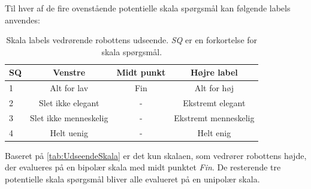 \newpage
%
Til hver af de fire ovenstående potentielle skala spørgsmål kan følgende labels anvendes:
%
\begin{table}[H]
	\centering
	\begin{tabular}{l|c|c|c}
		SQ     & Venstre & Midt punkt & Højre label \\\hline
		1   & Alt for lav  & Fin & Alt for høj        \\\hline
		2   & Slet ikke elegant & - & Ekstremt elegant         \\\hline
		3   & Slet ikke menneskelig & - & Ekstremt menneskelig         \\\hline
	 	4   & Helt uenig & - & Helt enig                   
	\end{tabular}  
	\caption{Skala labels vedrørende robottens udseende. \textit{SQ} er en forkortelse for skala spørgsmål.}
	\label{tab:UdseendeSkala}       
\end{table}
\noindent
%
Baseret på \autoref{tab:UdseendeSkala} er det kun skalaen, som vedrører robottens højde, der evalueres på en bipolær skala med midt punktet \textit{Fin}. De resterende tre potentielle skala spørgsmål bliver alle evalueret på en unipolær skala. 
%
